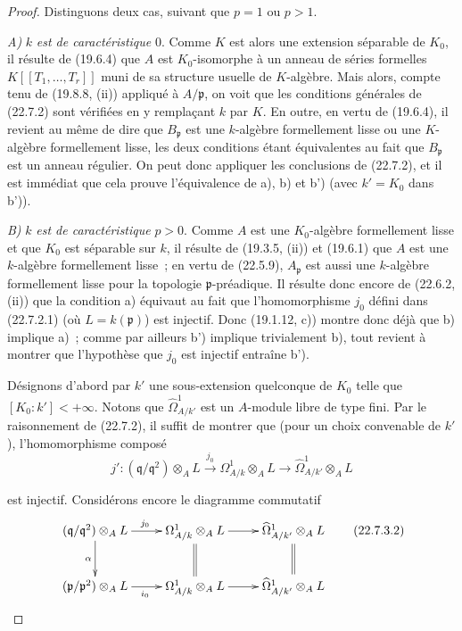 \begin{proof}
Distinguons deux cas, suivant que $p=1$ ou $p>1$.

\emph{A)} $k$ \emph{est de caractéristique} $0$. Comme $K$ est alors une
extension séparable de $K_0$, il résulte de (19.6.4) que $A$ est
$K_0$-isomorphe à un anneau de séries formelles $K[[T_1,\ldots,T_r]]$ muni de
sa structure usuelle de $K$-algèbre. Mais alors, compte tenu de (19.8.8, (ii))
appliqué à $A/\mathfrak p$, on voit que les conditions générales de (22.7.2)
sont vérifiées en y remplaçant $k$ par $K$. En outre, en vertu de (19.6.4), il
revient au même de dire que $B_{\mathfrak p}$ est une $k$-algèbre
formellement lisse ou une $K$-algèbre formellement lisse, les deux conditions
étant équivalentes au fait que $B_{\mathfrak p}$ est un anneau régulier. On
peut donc appliquer les conclusions de (22.7.2), et il est immédiat que cela
prouve l'équivalence de a), b) et b') (avec $k'=K_0$ dans b')).

\emph{B)} $k$ \emph{est de caractéristique} $p>0$. Comme $A$ est une
$K_0$-algèbre formellement lisse et que $K_0$ est séparable sur $k$, il
résulte de (19.3.5, (ii)) et (19.6.1) que $A$ est une $k$-algèbre
formellement lisse~; en vertu de (22.5.9), $A_{\mathfrak p}$ est aussi une
$k$-algèbre formellement lisse pour la topologie $\mathfrak p$-préadique. Il
résulte donc encore de (22.6.2, (ii)) que la condition a) équivaut au fait que
l'homomorphisme $j_0$ défini dans (22.7.2.1) (où $L=k(\mathfrak p)$) est
injectif. Donc (19.1.12, c)) montre donc déjà que b) implique a)~; comme par
ailleurs b') implique trivialement b), tout revient à montrer que l'hypothèse
que $j_0$ est injectif entraîne b').

Désignons d'abord par $k'$ une sous-extension quelconque de $K_0$ telle que
$[K_0:k']<+\infty$. Notons que $\widehat\Omega^1_{A/k'}$ est un $A$-module
libre de type fini. Par le raisonnement de (22.7.2), il suffit de montrer que
(pour un choix convenable de $k'$), l'homomorphisme composé
\begin{equation}
\label{0.22.7.3.1-fr}
  j':(\mathfrak q/\mathfrak q^2)\otimes_AL
  \xrightarrow{j_0}\Omega^1_{A/k}\otimes_AL
  \longrightarrow\widehat\Omega^1_{A/k'}\otimes_AL
  \tag{22.7.3.1}
\end{equation}


est injectif. Considérons encore le diagramme commutatif
\begin{equation}
\label{0.22.7.3.2-fr}
\xymatrix{
  (\mathfrak q/\mathfrak q^2)\otimes_AL
    \ar[r]^{j_0} \ar[d]_\alpha &
  \Omega^1_{A/k}\otimes_AL \ar[r] \ar@{=}[d] &
  \widehat\Omega^1_{A/k'}\otimes_AL \ar@{=}[d] \\
  (\mathfrak p/\mathfrak p^2)\otimes_AL
    \ar[r]_{i_0} &
  \Omega^1_{A/k}\otimes_AL \ar[r] &
  \widehat\Omega^1_{A/k'}\otimes_AL
}
\tag{22.7.3.2}
\end{equation}


\end{proof}
